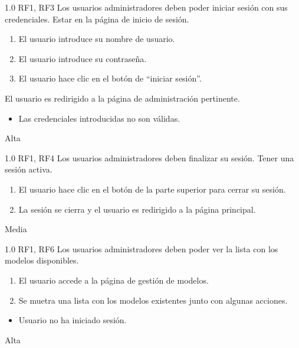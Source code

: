 {1.0}
{RF1, RF3}
{Los usuarios administradores deben poder iniciar sesión con sus credenciales.}
{Estar en la página de inicio de sesión.}
{
    \begin{enumerate}
        \def\labelenumi{\arabic{enumi}.}
        \tightlist
        \item El usuario introduce su nombre de usuario.
        \item El usuario introduce su contraseña.
        \item El usuario hace clic en el botón de ``iniciar sesión''.
    \end{enumerate}
}
{El usuario es redirigido a la página de administración pertinente.}
{
    \begin{itemize}
        \item Las credenciales introducidas no son válidas.
    \end{itemize}
}
{Alta}

{1.0}
{RF1, RF4}
{Los usuarios administradores deben finalizar su sesión.}
{Tener una sesión activa.}
{
    \begin{enumerate}
        \def\labelenumi{\arabic{enumi}.}
        \tightlist
        \item El usuario hace clic en el botón de la parte superior para cerrar su sesión.
        \item La sesión se cierra y el usuario es redirigido a la página principal.
    \end{enumerate}
}
{}
{}
{Media}

{1.0}
{RF1, RF6}
{Los usuarios administradores deben poder ver la lista con los modelos disponibles.}
{}
{
    \begin{enumerate}
        \def\labelenumi{\arabic{enumi}.}
        \tightlist
        \item El usuario accede a la página de gestión de modelos.
        \item Se muetra una lista con los modelos existentes junto con algunas acciones.
    \end{enumerate}
}
{}
{
    \begin{itemize}
        \item Usuario no ha iniciado sesión.
    \end{itemize}
}
{Alta}


